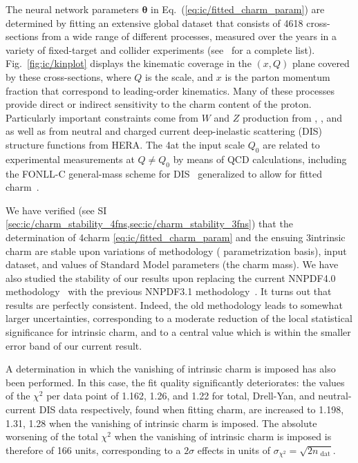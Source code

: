 The neural network parameters ${\boldsymbol \theta}$ in
Eq.~(\ref{eq:ic/fitted_charm_param})
are determined by fitting an extensive global dataset that consists of 4618 
cross-sections from a wide range of different processes, measured over
the years in a variety of fixed-target and collider experiments  (see~\cite{Ball:2021leu} for a complete list).
%
Fig.~\ref{fig:ic/kinplot} displays the kinematic coverage in the $(x,Q)$ plane
covered by these cross-sections, where $Q$ is
the  scale, and  $x$ is
the parton momentum fraction that correspond to leading-order kinematics.
%
Many of these processes provide direct or indirect sensitivity 
to the charm content of the proton.
%
Particularly important constraints come from $W$ and $Z$ production from 
\atlas, \cms, and \lhcb as well as from
neutral and charged current deep-inelastic 
scattering (DIS) structure functions from HERA.
%
The 4\fns  \pdfs at the input scale $Q_0$ are related
to experimental measurements at $Q \not =Q_0$ by means of \nnlo QCD calculations, including
the FONLL-C general-mass scheme for DIS~\cite{Forte:2010ta} generalized to 
allow for fitted charm~\cite{Ball:2015tna}.

We have verified (see SI
\cref{sec:ic/charm_stability_4fns,sec:ic/charm_stability_3fns}) that the
determination of 4\fns charm \pdf \cref{eq:ic/fitted_charm_param} and the ensuing
3\fns intrinsic charm \pdf are  stable upon variations of methodology (\pdf
parametrization basis), input dataset, and values of Standard Model parameters
(the charm mass).
We have also studied the stability of our results upon replacing the
current NNPDF4.0 methodology~\cite{Ball:2021leu} with the previous
NNPDF3.1 methodology~\cite{NNPDF:2017mvq}. It turns out that results
are  perfectly consistent. Indeed, the old methodology leads to somewhat larger
uncertainties, corresponding to a moderate reduction of the local statistical
significance for intrinsic charm, and to a central value which is
within the smaller  error band of our current result.


A determination in which the vanishing of intrinsic charm is
imposed has also been performed.
%
In this case, the fit quality significantly
deteriorates: the values of the $\chi^2$ per data point of 1.162,
1.26, and 1.22 for total, Drell-Yan, 
and neutral-current DIS data respectively, found when fitting charm, are 
increased to 1.198, 1.31, 1.28 when the vanishing of intrinsic charm
is imposed.
%
The absolute worsening of the total $\chi^2$ when the vanishing of intrinsic charm is imposed is therefore
of 166 units, corresponding to
a $2\sigma$ effects in units of $\sigma_{\chi^2}= \sqrt{2n_\textrm{ dat}}$.

